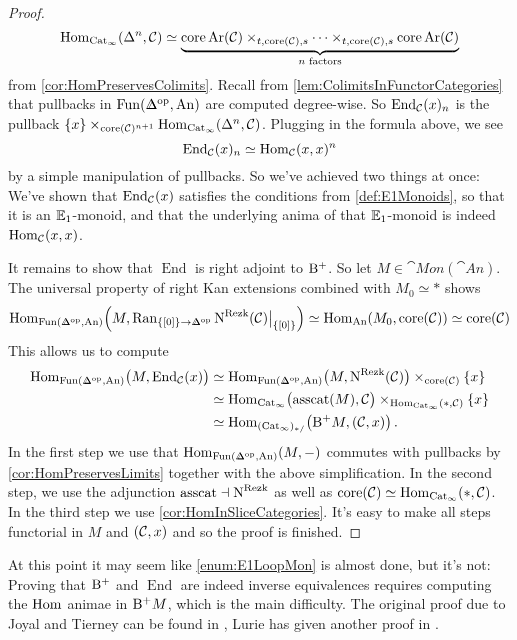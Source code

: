 \begin{proof}
	\begin{equation*}
		\operatorname{Hom}_{\mathrm{Cat}_\infty}(\Delta^n,\mathcal{C})\simeq \underbrace{\operatorname{core} \operatorname{Ar}(\mathcal{C})\times_{t,\operatorname{core}(\mathcal{C}),s}\dotsb\times_{t,\operatorname{core}(\mathcal{C}),s}\operatorname{core} \operatorname{Ar}(\mathcal{C})}_{n\text{ factors}}
	\end{equation*}
	from \cref{cor:HomPreservesColimits}. Recall from \cref{lem:ColimitsInFunctorCategories} that pullbacks in $\Fun(\IDelta^\op,\cat{An})$ are computed degree-wise. So $\operatorname{End}_{\mathcal{C}}(x)_n$ is the pullback $\{x\}\times_{\operatorname{core}(\mathcal{C})^{n+1}}\operatorname{Hom}_{\mathrm{Cat}_\infty}(\Delta^n,\mathcal{C})$. Plugging in the formula above, we see
	\begin{equation*}
		\operatorname{End}_{\mathcal{C}}(x)_n\simeq \operatorname{Hom}_{\mathcal{C}}(x,x)^n
	\end{equation*}
	by a simple manipulation of pullbacks. So we've achieved two things at once: We've shown that $\operatorname{End}_{\mathcal{C}}(x)$ satisfies the conditions from \cref{def:E1Monoids}, so that it is an $\mathbb{E}_1$-monoid, and that the underlying anima of that $\mathbb{E}_1$-monoid is indeed $\operatorname{Hom}_{\mathcal{C}}(x,x)$.
	
	It remains to show that $\operatorname{End}$ is right adjoint to $\mathrm{B}^+$. So let $M\in\cat{Mon}(\cat{An})$. The universal property of right Kan extensions combined with $M_0\simeq *$ shows 
	\begin{equation*}
		\Hom_{\Fun(\IDelta^\op,\cat{An})}\!\left(M,\Ran_{\{[0]\}\rightarrow \IDelta^\op}\N^\mathrm{Rezk}(\Cc)\big|_{\{[0]\}}\right)\simeq \Hom_{\cat{An}}(M_0,\core (\Cc))\simeq \core (\Cc)
	\end{equation*}
	This allows us to compute
	\begin{align*}
		\Hom_{\Fun(\IDelta^\op,\cat{An})}\bigl(M,\operatorname{End}_\Cc(x)\bigr)&\simeq \Hom_{\Fun(\IDelta^\op,\cat{An})}\bigl(M,\N^\mathrm{Rezk}(\Cc)\bigr)\times_{\core(\Cc)}\{x\}\\
		&\simeq \Hom_{\cat{Cat}_\infty}\bigl(\operatorname{asscat}(M),\Cc\bigr)\times_{\Hom_{\cat{Cat}_\infty}(*,\Cc)}\{x\}\\
		&\simeq \Hom_{(\cat{Cat}_\infty)_{*/}}\bigl(\B^+M,(\Cc,x)\bigr)\,.
	\end{align*}
	In the first step we use that $\Hom_{\Fun(\IDelta^\op,\cat{An})}(M,-)$ commutes with pullbacks by \cref{cor:HomPreservesLimits} together with the above simplification. In the second step, we use the adjunction $\operatorname{asscat}\dashv \operatorname{N}^\mathrm{Rezk}$ as well as $\operatorname{core}(\mathcal{C})\simeq \operatorname{Hom}_{\mathrm{Cat}_\infty}(*,\mathcal{C})$. In the third step we use \cref{cor:HomInSliceCategories}. It's easy to make all steps functorial in $M$ and $(\mathcal{C},x)$ and so the proof is finished.
\end{proof}
At this point it may seem like \cref{enum:E1LoopMon} is almost done, but it's not: Proving that $\mathrm{B}^+$ and $\operatorname{End}$ are indeed inverse equivalences requires computing the $\operatorname{Hom}$ animae in $\mathrm{B}^+M$, which is the main difficulty. The original proof due to Joyal and Tierney can be found in \cite{JoyalTierney}, Lurie has given another proof in \cite{LurieGoodwillieCalculus}.

